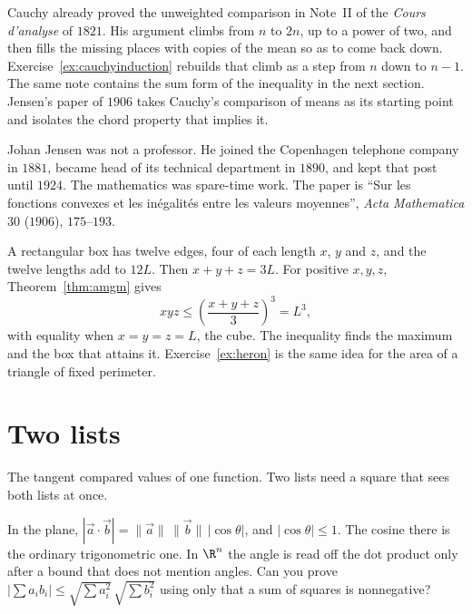 Cauchy already proved the unweighted comparison in Note~II of the \emph{Cours d'analyse} of $1821$. His argument climbs from $n$ to $2n$, up to a power of two, and then fills the missing places with copies of the mean so as to come back down. Exercise~\ref{ex:cauchyinduction} rebuilds that climb as a step from $n$ down to $n-1$. The same note contains the sum form of the inequality in the next section. Jensen's paper of $1906$ takes Cauchy's comparison of means as its starting point and isolates the chord property that implies it.

Johan Jensen was not a professor. He joined the Copenhagen telephone company in $1881$, became head of its technical department in $1890$, and kept that post until $1924$. The mathematics was spare-time work. The paper is ``Sur les fonctions convexes et les in\'egalit\'es entre les valeurs moyennes'', \emph{Acta Mathematica} $30$ ($1906$), $175$--$193$.


\begin{examplex}
A rectangular box has twelve edges, four of each length $x$, $y$ and $z$, and the twelve lengths add to $12L$. Then $x+y+z=3L$. For positive $x,y,z$, Theorem~\ref{thm:amgm} gives
\[
xyz\le\left(\frac{x+y+z}3\right)^3=L^3,
\]
with equality when $x=y=z=L$, the cube. The inequality finds the maximum and the box that attains it. Exercise~\ref{ex:heron} is the same idea for the area of a triangle of fixed perimeter.
\end{examplex}

\section{Two lists}\label{sec:twolists}

The tangent compared values of one function. Two lists need a square that sees both lists at once.

\begin{think}
In the plane, $|\vec a\cdot\vec b|=\|\vec a\|\,\|\vec b\|\,|\cos\theta|$, and $|\cos\theta|\le1$. The cosine there is the ordinary trigonometric one. In $\R^n$ the angle is read off the dot product only after a bound that does not mention angles. Can you prove $\bigl|\sum a_ib_i\bigr|\le\sqrt{\sum a_i^2}\,\sqrt{\sum b_i^2}$ using only that a sum of squares is nonnegative?
\end{think}

